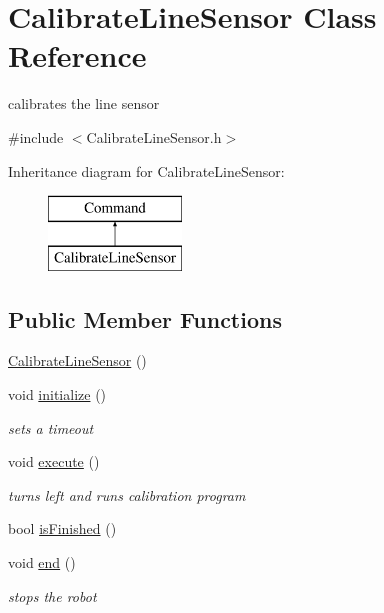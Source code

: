 \hypertarget{classCalibrateLineSensor}{\section{Calibrate\-Line\-Sensor Class Reference}
\label{classCalibrateLineSensor}
}


calibrates the line sensor  




{\ttfamily \#include $<$Calibrate\-Line\-Sensor.\-h$>$}

Inheritance diagram for Calibrate\-Line\-Sensor\-:\begin{figure}[H]
\begin{center}
\leavevmode
\includegraphics[height=2.000000cm]{classCalibrateLineSensor}
\end{center}
\end{figure}
\subsection*{Public Member Functions}
\begin{DoxyCompactItemize}
\item 
\hyperlink{classCalibrateLineSensor_a1fe03550069716cc8c201255b75be4ea}{Calibrate\-Line\-Sensor} ()
\item 
void \hyperlink{classCalibrateLineSensor_a45da26c9f90a457f7dc3cad6d660f1b6}{initialize} ()
\begin{DoxyCompactList}\small\item\em sets a timeout \end{DoxyCompactList}\item 
void \hyperlink{classCalibrateLineSensor_af9915cde1364b1cc235088f755abccd6}{execute} ()
\begin{DoxyCompactList}\small\item\em turns left and runs calibration program \end{DoxyCompactList}\item 
bool \hyperlink{classCalibrateLineSensor_a59ae2007e64462f50034006eeee0bc5f}{is\-Finished} ()
\item 
void \hyperlink{classCalibrateLineSensor_ae5cdfbb59fa0fd63828ae70f865998b2}{end} ()
\begin{DoxyCompactList}\small\item\em stops the robot \end{DoxyCompactList}\end{DoxyCompactItemize}
